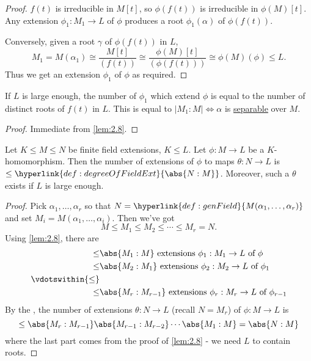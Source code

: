 \documentclass{article}
\begin{document}
\begin{proof}
    $f(t)$ is irreducible in $M[t]$, so $\phi(f(t))$ is irreducible in $\phi(M)[t]$.
    Any extension $\phi_1: M_1 \to L$ of $\phi$ produces a root $\phi_1(\alpha)$ of $\phi(f(t))$.

    Conversely, given a root $\gamma$ of $\phi(f(t))$ in $L$,
    \begin{equation*}
        M_1 = M(\alpha_1) \cong \frac{M[t]}{(f(t))} \cong \frac{\phi(M)[t]}{(\phi(f(t)))} \cong \phi(M)(\phi) \leq L.
    \end{equation*}
    Thus we get an extension $\phi_1$ of $\phi$ as required.
\end{proof}

\begin{ncor}\label{cor:2.9}
    If $L$ is large enough, the number of $\phi_1$ which extend $\phi$ is equal to the number of distinct roots of $f(t)$ in $L$.
    This is equal to $|M_1:M| \iff \alpha$ is \hyperlink{def:separableExt}{separable} over $M$.
\end{ncor}

\begin{proof}
    Immediate from \cref{lem:2.8}.
\end{proof}

\begin{ncor}\label{cor:2.10}
    Let $K \leq M \leq N$ be finite field extensions, $K \leq L$. Let $\phi: M \to L$ be a $K$-homomorphism.
    Then the number of extensions of $\phi$ to maps $\theta:N \to L$ is $\leq \hyperlink{def:degreeOfFieldExt}{\abs{N:M}}$.
    Moreover, such a $\theta$ exists if $L$ is large enough.
\end{ncor}

\begin{proof}
    Pick $\alpha_1, \dotsc, \alpha_r$ so that $N = \hyperlink{def:genField}{M(\alpha_1, \dotsc, \alpha_r)}$ and set $M_i = M(\alpha_1, \dotsc,\alpha_i)$. Then we've got
    \begin{equation*}
        M \leq M_1 \leq M_2 \leq \dotsb \leq M_r = N.
    \end{equation*}
    Using \cref{lem:2.8}, there are
    \begin{align*}
        \leq& \abs{M_1:M} \text{ extensions } \phi_1 : M_1 \to L \text{ of } \phi \\
        \leq& \abs{M_2:M_1} \text{ extensions } \phi_2 : M_2 \to L \text{ of } \phi_1 \\
        \vdotswithin{\leq}\\
        \leq& \abs{M_r:M_{r-1}} \text{ extensions } \phi_r : M_r \to L \text{ of } \phi_{r-1}
    \end{align*}
    By the , the number of extensions $\theta: N \to L$ (recall $N=M_r$) of $\phi:M \to L$ is
    \begin{equation*}
        \leq \abs{M_r:M_{r-1}} \abs{M_{r-1}:M_{r-2}} \cdots \abs{M_1:M} = \abs{N:M}
    \end{equation*}
    where the last part comes from the proof of \cref{lem:2.8} - we need $L$ to contain roots.
\end{proof}
\end{document}
